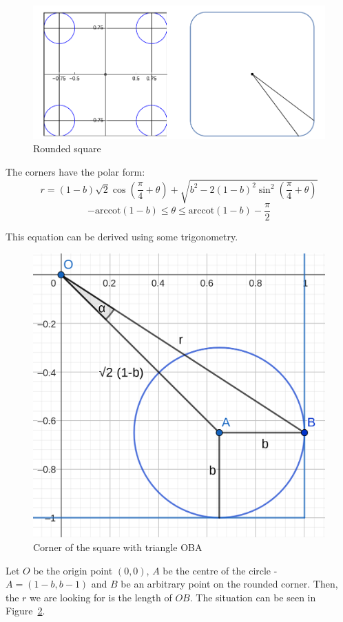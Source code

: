 \documentclass[12pt]{article}
\begin{document}
        \begin{figure}[H]
            \centering
            \includegraphics[width=0.9\linewidth]{images/rounded_square.png}
            \caption{Rounded square\cite{bridge_wolfram}}\label{fig:rounded_square}
        \end{figure}

        The corners have the polar form\cite{bridge_wolfram}:
        \begin{equation}
            r = (1-b)\sqrt{2} \cos (\frac{\pi}{4} + \theta) + \sqrt{b^2 - 2(1-b)^2 \sin^2 (\frac{\pi}{4}+\theta)}
        \end{equation}
        \[- \text{arccot}(1-b) \leq \theta \leq \text{arccot}(1-b) - \frac{\pi}{2}\]

        This equation can be derived using some trigonometry. 
        \begin{figure}[H]
            \centering \includegraphics[width=0.5\linewidth]{images/corner_cos_rule.png}
            \caption[Corner of the square with triangle OBA]{Corner of the square with triangle OBA\footnotemark}\label{fig:corner_cos_rule}
        \end{figure}

        Let $O$ be the origin point $(0,0)$, $A$ be the centre of the circle - $A =(1-b,b-1)$ and $B$ be an arbitrary point on the rounded corner. Then, the $r$ we are looking for is the length of $OB$. The situation can be seen in Figure~\ref{fig:corner_cos_rule}.
\end{document}
